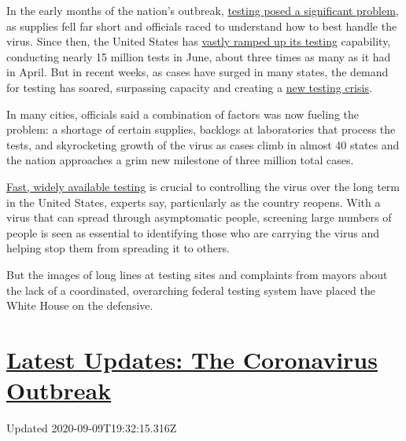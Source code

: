 In the early months of the nation's outbreak,
\href{https://www.nytimes3xbfgragh.onion/2020/04/06/health/coronavirus-testing-us.html}{testing
posed a significant problem}, as supplies fell far short and officials
raced to understand how to best handle the virus. Since then, the United
States has \href{https://covidtracking.com/data/us-daily}{vastly ramped
up its testing} capability, conducting nearly 15 million tests in June,
about three times as many as it had in April. But in recent weeks, as
cases have surged in many states, the demand for testing has soared,
surpassing capacity and creating a
\href{https://www.nytimes3xbfgragh.onion/2020/07/23/health/coronavirus-testing-supply-shortage.html}{new
testing crisis}.

In many cities, officials said a combination of factors was now fueling
the problem: a shortage of certain supplies, backlogs at laboratories
that process the tests, and skyrocketing growth of the virus as cases
climb in almost 40 states and the nation approaches a grim new milestone
of three million total cases.

\href{https://www.nytimes3xbfgragh.onion/2020/07/06/health/fast-coronavirus-tests.html}{Fast,
widely available testing} is crucial to controlling the virus over the
long term in the United States, experts say, particularly as the country
reopens. With a virus that can spread through asymptomatic people,
screening large numbers of people is seen as essential to identifying
those who are carrying the virus and helping stop them from spreading it
to others.

But the images of long lines at testing sites and complaints from mayors
about the lack of a coordinated, overarching federal testing system have
placed the White House on the defensive.

\hypertarget{latest-updates-the-coronavirus-outbreak}{%
\section{\texorpdfstring{\href{https://www.nytimes3xbfgragh.onion/2020/09/09/world/covid-coronavirus.html?action=click\&pgtype=Article\&state=default\&region=MAIN_CONTENT_1\&context=storylines_live_updates}{Latest
Updates: The Coronavirus
Outbreak}}{Latest Updates: The Coronavirus Outbreak}}\label{latest-updates-the-coronavirus-outbreak}}

Updated 2020-09-09T19:32:15.316Z

